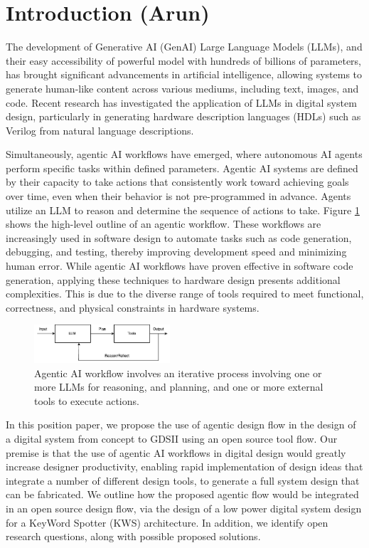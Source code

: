 \section{Introduction (Arun)}
\label{sec:introduction}

The development of Generative AI (GenAI) Large Language Models (LLMs), and their easy accessibility of powerful model with hundreds of billions of parameters,  has brought significant advancements in artificial intelligence, allowing systems to generate human-like content across various mediums, including text, images, and code. Recent research has investigated the application of LLMs in digital system design, particularly in generating hardware description languages (HDLs) such as Verilog from natural language descriptions. 

Simultaneously, agentic AI workflows have emerged, where autonomous AI agents perform specific tasks within defined parameters. Agentic AI systems are defined by their capacity to take actions that consistently work toward achieving goals over time, even when their behavior is not pre-programmed in advance. Agents utilize an LLM to reason and determine the sequence of actions to take. Figure \ref{fig:agenttic_overview} shows the high-level outline of an agentic workflow.  These workflows are increasingly used in software design to automate tasks such as code generation, debugging, and testing, thereby improving development speed and minimizing human error. While agentic AI workflows have proven effective in software code generation, applying these techniques to hardware design presents additional complexities. This is due to the diverse range of tools required to meet functional, correctness, and physical constraints in hardware systems.


\begin{figure}[htbp]
	\includegraphics[width=0.45\textwidth]{figs/agentic_overview.png}
	\caption{Agentic AI workflow involves an iterative process involving one or more LLMs for reasoning, and planning, and one or more external tools to execute actions.
}
	\label{fig:agenttic_overview}
\end{figure}

In this position paper, we propose the use of agentic design flow in the design of a digital system from concept to GDSII using an open source tool flow. Our premise is that the use of agentic AI workflows in digital design would greatly increase designer productivity, enabling rapid implementation of design ideas that integrate a number of different design tools, to generate a full system design that can be fabricated. We outline how the proposed agentic flow would be integrated in an open source design flow, via the design of a low power digital system design for a KeyWord Spotter (KWS) architecture. In addition, we identify open research questions, along with possible proposed solutions. 

